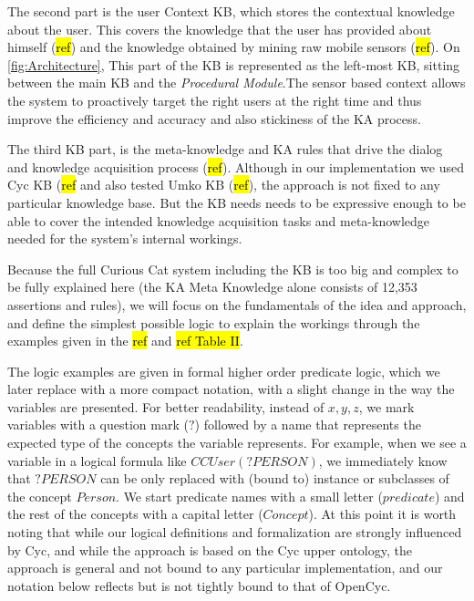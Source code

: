 The second part is the user Context KB, which stores the contextual knowledge 
about the user. This covers the knowledge that the user has provided about 
himself (\hl{ref}) and the knowledge obtained by mining raw mobile sensors 
(\hl{ref}). On \autoref{fig:Architecture}, This part of the KB is represented 
as the left-most KB, sitting between the main KB and the 
\emph{Procedural Module}.The sensor based context allows the system to 
proactively target the right users at the right time and thus improve the 
efficiency and accuracy and also stickiness of the KA process.

The third KB part, is the meta-knowledge and KA rules that drive the dialog and 
knowledge acquisition process (\hl{ref}). Although in our implementation we 
used Cyc KB (\hl{ref} and also tested Umko KB (\hl{ref}), the approach is not 
fixed to any particular knowledge base. But the KB needs needs to be expressive
enough to be able to cover the intended knowledge acquisition tasks and 
meta-knowledge needed for the system's internal workings. 

Because the full Curious Cat system including the KB is too big and complex to 
be fully explained here (the KA Meta Knowledge alone consists of 12,353 
assertions and rules), we will focus on the fundamentals of the idea and 
approach, and define the simplest possible logic to explain the workings 
through the examples given in the \hl{ref} and  \hl{ref Table II}. 

The logic examples are given in formal higher order predicate logic, which we 
later replace with a more compact notation, with a slight change in the way the 
variables are presented. For better readability, instead of $x, y, z$, we mark 
variables with a question mark ($?$) followed by a name that represents the 
expected type of the concepts the variable represents. For example, when we see 
a variable in a logical formula like $CCUser(?PERSON)$, we immediately know that
$?PERSON$ can be only replaced with (bound to) instance or subclasses of the 
concept $Person$. We start predicate names with a small letter 
($predicate$) and the rest of the 
concepts with a capital letter ($Concept$). At this point it is worth noting 
that while our logical definitions and formalization are strongly influenced by 
Cyc\parencite{Lenat1995}, and while the approach is based on the Cyc upper 
ontology, the approach is general and not bound to any particular 
implementation, and our notation below reflects but is not tightly bound to 
that of OpenCyc. 

